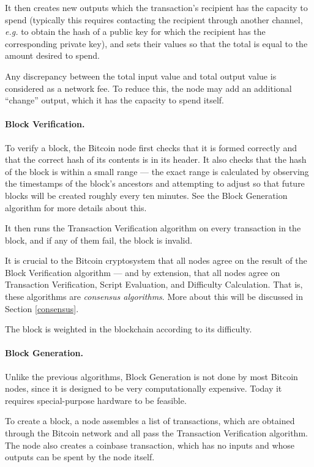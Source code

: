 \documentclass[letterpaper]{article}
\begin{document}
It then creates new outputs which the transaction's recipient has
the capacity to spend (typically this requires contacting the recipient
through another channel, \emph{e.g.} to obtain the hash of a public
key for which the recipient has the corresponding private key), and
sets their values so that the total is equal to the amount desired
to spend.

Any discrepancy between the total input value and total output value
is considered as a network fee. To reduce this, the node may add an
additional ``change'' output, which it has the capacity to spend itself.

\paragraph{Block Verification.} To verify a block, the Bitcoin node
first checks that it is formed correctly and that the correct hash of
its contents is in its header. It also checks that the hash of the
block is within a small range --- the exact range is calculated by
observing the timestamps of the block's ancestors and attempting to
adjust so that future blocks will be created roughly every ten minutes.
See the Block Generation algorithm for more details about this. 

It then runs the Transaction Verification algorithm on every transaction
in the block, and if any of them fail, the block is invalid.

It is crucial to the Bitcoin cryptosystem that all nodes agree on the
result of the Block Verification algorithm --- and by extension, that
all nodes agree on Transaction Verification, Script Evaluation, and
Difficulty Calculation. That is, these algorithms are \emph{consensus
algorithms}. More about this will be discussed in Section \ref{consensus}.

The block is weighted in the blockchain according to its difficulty.

\paragraph{Block Generation.} Unlike the previous algorithms, Block
Generation is not done by most Bitcoin nodes, since it is designed to
be very computationally expensive. Today it requires special-purpose
hardware to be feasible.

To create a block, a node assembles a list of transactions, which are
obtained through the Bitcoin network and all pass the Transaction
Verification algorithm. The node also creates a coinbase transaction,
which has no inputs and whose outputs can be spent by the node itself.
\end{document}
